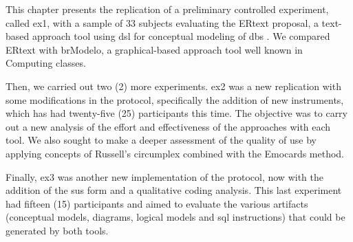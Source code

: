 This chapter presents the replication of a preliminary controlled experiment, called \ac{ex1}, with a sample of 33 subjects evaluating the ERtext proposal, a text-based approach tool using \ac{dsl} for conceptual modeling of \acp{db} .
We compared ERtext with brModelo, a graphical-based approach tool well known in Computing classes.

Then, we carried out two (2) more experiments.
\ac{ex2} was a new replication with some modifications in the protocol, specifically the addition of new instruments, which has had twenty-five (25) participants this time.
The objective was to carry out a new analysis of the effort and effectiveness of the approaches with each tool.
We also sought to make a deeper assessment of the quality of use by applying concepts of Russell's circumplex combined with the Emocards method.

Finally, \ac{ex3} was another new implementation of the protocol, now with the addition of the \ac{sus} form and a qualitative coding analysis.
This last experiment had fifteen (15) participants and aimed to evaluate the various artifacts (conceptual models, diagrams, logical models and \ac{sql} instructions) that could be generated by both tools.

